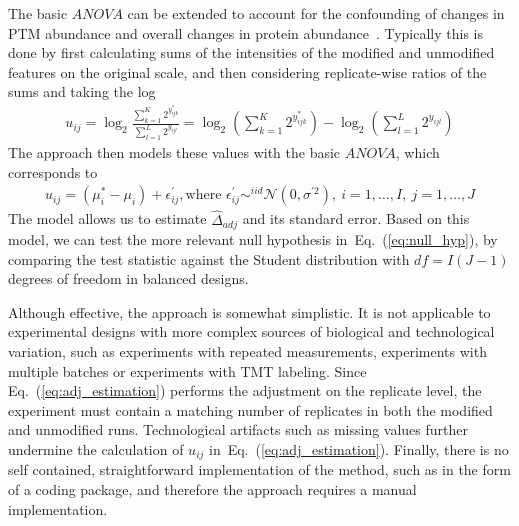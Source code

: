 \documentclass[mcp]{article}
\numberwithin{table}{section}
\def\eqref#1{Eq.~(\ref{eq:#1})}
\begin{document}
\medskip \noindent 
The basic $ANOVA$ can be extended to account for the confounding of changes in PTM abundance and overall changes in protein abundance~\cite{Schwammle2015,THOMAS2020,Mertins:2013}. Typically this is done by first calculating sums of the intensities of the modified and unmodified features on the original scale, and then considering replicate-wise ratios of the sums and taking the log
\begin{eqnarray}
u_{ij} = \log_2 \frac{ \sum_{k=1}^{K} 2^{y_{ijk}^{\ast}} }{ \sum_{l=1}^{L} 2^{y_{ijl}} } = \log_2 \left( \sum_{k=1}^{K} 2^{y_{ijk}^{\ast}} \right) - \log_2 \left( \sum_{l=1}^{L} 2^{y_{ijl}} \right)
\label{eq:adj_estimation}
\end{eqnarray}
The approach then models these values with the basic $ANOVA$, which corresponds to 
\begin{eqnarray}
u_{ij} = (\mu^{\ast}_{i}-\mu_i) + \epsilon^{\prime}_{ij}, \text{where } \epsilon^{\prime}_{ij} \mathop\sim^{iid} \mathcal{N}(0, \sigma^{\prime 2}),\ i=1,\ldots,I,\ j=1,\ldots,J
\label{eq:ttest_ratio_model}
\end{eqnarray}
The model allows us to estimate $\hat{\Delta}_{adj}$ and its standard error.
Based on this model, we can test the more relevant null hypothesis in~\eqref{null_hyp}, by comparing the test statistic against the Student distribution with $df=I(J-1)$ degrees of freedom in balanced designs.

Although effective, the approach is somewhat simplistic. It is not applicable to experimental designs with more complex sources of biological and technological variation, such as experiments with repeated measurements, experiments with multiple batches or experiments with TMT labeling. Since \eqref{adj_estimation} performs the adjustment on the replicate level, the experiment must contain a matching number of replicates in both the modified and unmodified runs. Technological artifacts such as missing values further undermine the calculation of $u_{ij}$ in~\eqref{adj_estimation}. Finally, there is no self contained, straightforward implementation of the method, such as in the form of a coding package, and therefore the approach requires a manual implementation.

\medskip {} 
\end{document}
